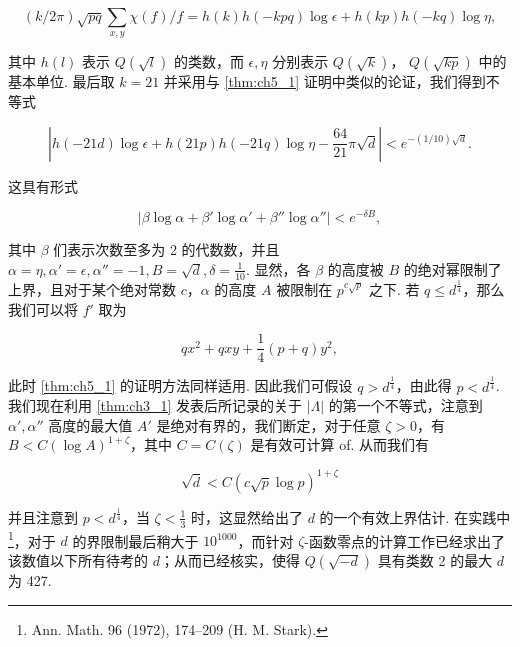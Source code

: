 \[(k/2\pi)\sqrt{pq}\sum_{x,y}\chi(f)/f=h(k)h(-kpq)\log\epsilon+h(kp)h(-kq)\log\eta,\]

其中 $h(l)$ 表示 $Q(\sqrt{l})$ 的类数，而 $\epsilon, \eta$ 分别表示 $Q(\sqrt{k})$， $Q(\sqrt{kp})$ 中的基本单位. 最后取 $k=21$ 并采用与 \autoref{thm:ch5_1} 证明中类似的论证，我们得到不等式

\[|h(-21d)\log \epsilon + h(21p)h(-21q)\log \eta - \frac{64}{21}\pi\sqrt{d}| < e^{-(1/10)\sqrt{d}}.\]

这具有形式

\[\left|\beta\log\alpha+\beta'\log\alpha'+\beta''\log\alpha''\right|< e^{-\delta B},\]

其中 $\beta$ 们表示次数至多为 2 的代数数，并且 $\alpha = \eta, \alpha' = \epsilon, \alpha'' = -1, B = \sqrt{d}, \delta = \frac{1}{10}$. 显然，各 $\beta$ 的高度被 $B$ 的绝对幂限制了上界，且对于某个绝对常数 $c$，$\alpha$ 的高度 $A$ 被限制在 $p^{c\sqrt{p}}$ 之下. 若 $q \le d^{\frac{1}{4}}$，那么我们可以将 $f'$ 取为

\[ qx^2 + qxy + \frac{1}{4}(p+q)y^2, \]

此时 \autoref{thm:ch5_1} 的证明方法同样适用. 因此我们可假设 $q > d^{\frac{1}{4}}$，由此得 $p < d^{\frac{1}{4}}$. 我们现在利用 \autoref{thm:ch3_1} 发表后所记录的关于 $|\Lambda|$ 的第一个不等式，注意到 $\alpha', \alpha''$ 高度的最大值 $A'$ 是绝对有界的，我们断定，对于任意 $\zeta > 0$，有 $B < C(\log A)^{1+\zeta}$，其中 $C = C(\zeta)$ 是有效可计算 of. 从而我们有

\[\sqrt{d} < C(c\sqrt{p}\log p)^{1+\zeta}\]

并且注意到 $p < d^{\frac{1}{4}}$，当 $\zeta < \frac{1}{3}$ 时，这显然给出了 $d$ 的一个有效上界估计. 在实践中\footnote{Ann. Math. 96 (1972), 174--209 (H. M. Stark).}，对于 $d$ 的界限制最后稍大于 $10^{1000}$，而针对 $\zeta$-函数零点的计算工作已经求出了该数值以下所有待考的 $d$；从而已经核实，使得 $Q(\sqrt{-d})$ 具有类数 2 的最大 $d$ 为 427.

